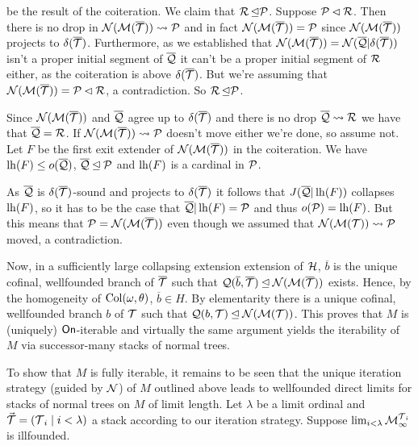 \documentclass[../main]{subfiles}
\begin{document}
{{    be the result of the coiteration. We claim that
    $\R\init\P$. Suppose $\P\pinit\R$. Then there is no drop in
    $\N(\M(\overline\T))\leadsto\P$ and in fact
    $\N(\M(\overline\T))=\P$ since $\N(\M(\overline\T))$ projects to
    $\delta(\overline\T)$. Furthermore, as we established that
    $\N(\M(\overline\T))=\N(\overline\Q|\delta(\overline\T))$ isn't a
    proper initial segment of $\overline\Q$ it can't be a proper
    initial segment of $\R$ either, as the coiteration is above
    $\delta(\overline\T)$. But we're assuming that
    $\N(\M(\overline\T))=\P\pinit\R$, a contradiction. So $\R\init\P$.
        
    \qquad Since $\N(\M(\overline\T))$ and $\overline\Q$ agree up to
    $\delta(\overline\T)$ and there is no drop $\overline\Q\leadsto\R$
    we have that $\overline\Q=\R$. If $\N(\M(\overline\T))\leadsto\P$
    doesn't move either we're done, so assume not. Let $F$ be the
    first exit extender of $\N(\M(\overline\T))$ in the
    coiteration. We have $\lh(F) \le o(\overline\Q)$,
    $\overline\Q\init\P$ and $\lh(F)$ is a cardinal in $\P$.
        
    \qquad As $\overline\Q$ is $\delta(\overline\T)$-sound and
    projects to $\delta(\overline\T)$ it follows that
    $J(\overline\Q|\lh(F))$ collapses $\lh(F)$, so it has to be the
    case that $\overline\Q|\lh(F)=\P$ and thus $o(\P)=\lh(F)$. But
    this means that $\P=\N(\M(\overline\T))$ even though we assumed
    that $\N(\M(\T))\leadsto\P$ moved, a contradiction.
    }

  \qquad Now, in a sufficiently large collapsing extension extension
  of $\h$, $\overline b$ is the unique cofinal, wellfounded branch of
  $\overline\T$ such that
  $\Q(\overline b,\overline\T) \init\N(\M(\overline\T))$
  exists. Hence, by the homogeneity of $\col(\omega,\theta)$,
  $\overline b \in H$. By elementarity there is a unique cofinal,
  wellfounded branch $b$ of $\T$ such that $\Q(b,\T)
  \init\N(\M(\T))$. This proves that $M$ is (uniquely) $\on$-iterable
  and virtually the same argument yields the iterability of $M$ via
  successor-many stacks of normal trees.
  
  \qquad To show that $M$ is fully iterable, it remains to be seen
  that the unique iteration strategy (guided by $\N$) of $M$ outlined
  above leads to wellfounded direct limits for stacks of normal trees
  on $M$ of limit length. Let $\lambda$ be a limit ordinal and
  $\vec\T = (\T_i \mid i<\lambda)$ a stack according to our iteration
  strategy. Suppose $\lim_{i<\lambda}\M^{\T_i}_\infty$ is illfounded.
  
}
\end{document}
